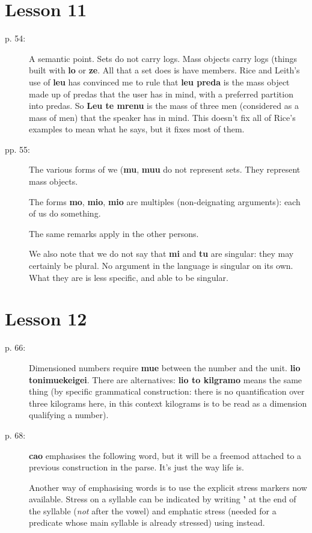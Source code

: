 \documentclass[12pt]{article}
\begin{document}
\section{Lesson 11}

\begin{description}


\item[p. 54:]  A semantic point.  Sets do not carry logs.  Mass objects carry logs (things built with {\bf lo} or {\bf ze}.
All that a set does is have members.  Rice and Leith's use of {\bf leu} has convinced me to rule that {\bf leu preda} is the mass object made up of predas that the user has in mind, with a preferred partition into predas.  So {\bf Leu te mrenu} is the mass of three men (considered as a mass of men) that the speaker has in mind.  This doesn't fix all of Rice's examples to mean what he says, but it fixes most of them.

\item[pp. 55:]   The various forms of we ({\bf mu}, {\bf muu} do not represent sets.  They represent mass objects.

The forms {\bf mo}, {\bf mio}, {\bf mio} are multiples (non-deignating arguments):  each of us do something.

The same remarks apply in the other persons.

We also note that we do not say that {\bf mi} and {\bf tu} are singular:  they may certainly be plural.  No argument in the language is singular on its own.  What they are is less specific, and able to be singular.


\end{description}

\section{Lesson 12}

\begin{description}

\item[p. 66:]  Dimensioned numbers require {\bf mue} between the number and the unit.  {\bf lio tonimuekeigei}.  There are alternatives:  {\bf lio to kilgramo} means the same thing (by specific grammatical construction:  there is no quantification over three kilograms here, in this context kilograms is to be read as a dimension qualifying a number).

\item[p. 68:]  {\bf cao} emphasises the following word, but it will be a freemod attached to a previous construction in the parse.  It's just the way life is.

Another way of emphasising words is to use the explicit stress markers now available.  Stress on a syllable can be indicated by writing {\bf '} at the end of the syllable ({\em not\/} after the vowel) and emphatic stress (needed for a predicate whose main syllable is already stressed) using {\bf *} instead.

\end{description}
\end{document}
